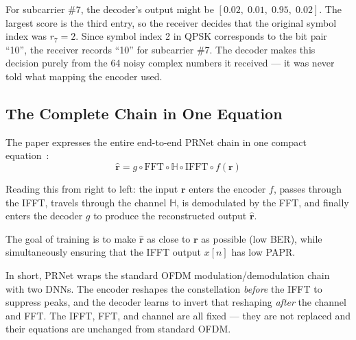 \begin{workingexample}
    For subcarrier \#7, the decoder's output might be
    $[0.02,\; 0.01,\; 0.95,\; 0.02]$.  The largest score is the third entry,
    so the receiver decides that the original symbol index was $r_7 = 2$.
    Since symbol index 2 in QPSK corresponds
    to the bit pair ``10'', the receiver records ``10'' for subcarrier \#7.
    The decoder makes this decision purely from the 64 noisy complex numbers
    it received --- it was never told what mapping the encoder used.
\end{workingexample}


\subsection{The Complete Chain in One Equation}

The paper expresses the entire end-to-end PRNet chain in one compact
equation~\cite{kim2017novel}:
\begin{equation}
    \boxed{\hat{\bm{r}}
    = g \circ \mathrm{FFT} \circ \mathbb{H} \circ \mathrm{IFFT}
      \circ f(\bm{r})}
    \label{eq:prnet_chain}
\end{equation}

Reading this from right to left: the input $\bm{r}$ enters the encoder $f$,
passes through the IFFT, travels through the channel $\mathbb{H}$,
is demodulated by the FFT, and finally enters the decoder $g$ to produce
the reconstructed output $\hat{\bm{r}}$.

The goal of training is to make $\hat{\bm{r}}$ as close to $\bm{r}$ as
possible (low BER), while simultaneously ensuring that the IFFT output
$x[n]$ has low PAPR.

In short, PRNet wraps the standard OFDM modulation/demodulation chain with
two DNNs.  The encoder reshapes the constellation \emph{before} the IFFT to
suppress peaks, and the decoder learns to invert that reshaping \emph{after}
the channel and FFT.  The IFFT, FFT, and channel are all fixed --- they
are not replaced and their equations are unchanged from standard OFDM.

